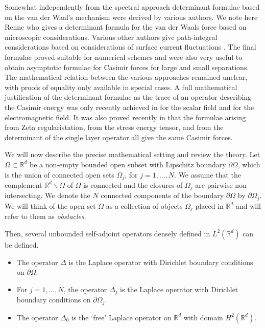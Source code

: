 Somewhat independently from the spectral approach determinant formulae based on the van der Waal's mechanism were derived by various authors. 
We note here Renne \cite{renne1971microscopic} who gives a determinant formula for the van der Waals force based on microscopic considerations. Various other authors 
give path-integral considerations based on considerations of surface current fluctuations 
\cite{bimonte2017nonequilibrium, emig2007casimir, emig2006casimir, EGJK2008, emig2008casimir, kenneth2006opposites, kenneth2008casimir, milton2008multiple, rahi2009scattering}. The final formulae proved suitable for numerical schemes 
and were also very useful to obtain asymptotic formulae for Casimir forces for large and small separations. The mathematical relation between the various 
approaches remained unclear, with proofs of equality only available in special cases.
A full mathematical justification of the determinant formulae as the trace of an operator describing the Casimir energy was only recently achieved in 
\cite{hanisch2020relative} for the scalar field and \cite{strohmaier2021classical} for the electromagnetic field. It was also proved recently in \cite{fang2021mathematical} that the 
formulae arising from Zeta regularistation, from the stress energy tensor, and from the determinant of the single layer operator all give the same Casimir forces.

We will now describe the precise mathematical setting and review the theory.
Let $\Omega \subset \mathbb{R}^{d}$ be a non-empty bounded open subset with Lipschitz boundary $\partial \Omega$, which is the union of connected open 
sets $\Omega_{j}$, for $j = 1, \dots, N$. We assume that the complement $\mathbb{R}^{d} \backslash \Omega$ of $\Omega$ is connected and the closures of $\Omega_{j}$ 
are pairwise non-intersecting.
We denote the  $N$ connected components of the boundary $\partial\Omega$ by $\partial\Omega_{j}$. 
We will think of the open set $\Omega$ as a collection of objects $\Omega_{j}$ placed in $\mathbb{R}^{d}$ and will refer to them as {\sl obstacles}.

Then, several unbounded self-adjoint operators densely defined in $L^{2}(\mathbb{R}^{d})$
can be defined.
\begin{itemize}
    \item The operator $\Delta$ is the Laplace operator with Dirichlet boundary conditions on $\partial\Omega$.
    \item For $j = 1, \dots, N$, the operator $\Delta_{j}$ is the Laplace operator with Dirichlet boundary conditions on $\partial\Omega_{j}$.
    \item The operator $\Delta_{0}$ is the `free' Laplace operator on $\mathbb{R}^{d}$ with domain $H^{2}(\mathbb{R}^{d})$.
\end{itemize}

